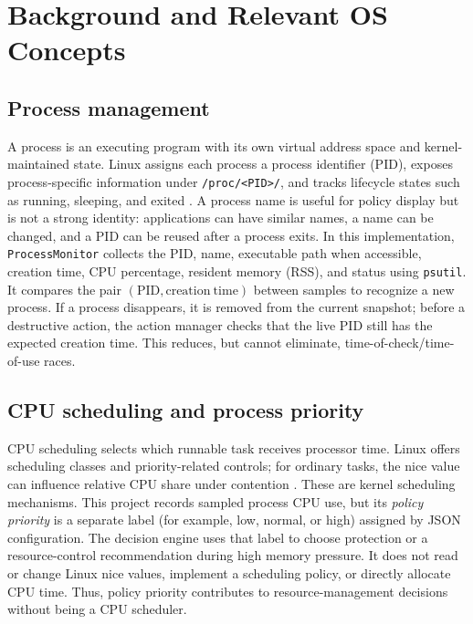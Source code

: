 \documentclass[12pt,a4paper]{article}
\newcommand{\code}[1]{\texttt{#1}}
\begin{document}
\section{Background and Relevant OS Concepts}
\subsection{Process management}
A process is an executing program with its own virtual address space and kernel-maintained state. Linux assigns each process a process identifier (PID), exposes process-specific information under \code{/proc/<PID>/}, and tracks lifecycle states such as running, sleeping, and exited \cite{proc-man}. A process name is useful for policy display but is not a strong identity: applications can have similar names, a name can be changed, and a PID can be reused after a process exits. In this implementation, \code{ProcessMonitor} collects the PID, name, executable path when accessible, creation time, CPU percentage, resident memory (RSS), and status using \code{psutil}. It compares the pair $(\mathrm{PID},\mathrm{creation\ time})$ between samples to recognize a new process. If a process disappears, it is removed from the current snapshot; before a destructive action, the action manager checks that the live PID still has the expected creation time. This reduces, but cannot eliminate, time-of-check/time-of-use races.

\subsection{CPU scheduling and process priority}
CPU scheduling selects which runnable task receives processor time. Linux offers scheduling classes and priority-related controls; for ordinary tasks, the nice value can influence relative CPU share under contention \cite{sched-man}. These are kernel scheduling mechanisms. This project records sampled process CPU use, but its \emph{policy priority} is a separate label (for example, low, normal, or high) assigned by JSON configuration. The decision engine uses that label to choose protection or a resource-control recommendation during high memory pressure. It does not read or change Linux nice values, implement a scheduling policy, or directly allocate CPU time. Thus, policy priority contributes to resource-management decisions without being a CPU scheduler.
\end{document}
